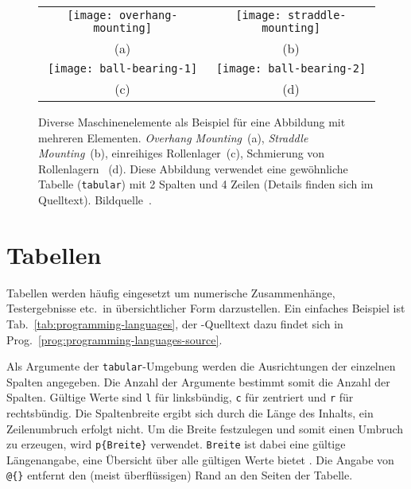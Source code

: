 \begin{figure}
	\centering\small
	\begin{tabular}{@{}c@{\hspace{12mm}}c@{}} %
		\texttt{[image: overhang-mounting]} &
		\texttt{[image: straddle-mounting]}
		\\
		(a) & (b)
		\\[4pt]    %
		\texttt{[image: ball-bearing-1]} &
		\texttt{[image: ball-bearing-2]}
		\\
		(c) & (d)
	\end{tabular}
%
	\caption{Diverse Maschinenelemente als Beispiel für eine Abbildung mit
	mehreren Elementen. \emph{Overhang Mounting}~(a), \emph{Straddle
	Mounting}~(b), einreihiges Rollenlager~(c), Schmierung von Rollenlagern~
	(d). Diese Abbildung verwendet eine gewöhnliche Tabelle
	(\texttt{tabular}) mit 2 Spalten und 4 Zeilen (Details finden sich im
	Quelltext). Bildquelle~\cite{Faires1934}.}
	\label{fig:Bearings}
\end{figure}


\section{Tabellen}
\label{sec:tabellen}

Tabellen werden häufig eingesetzt um numerische Zusammenhänge, Testergebnisse
etc.\ in übersichtlicher Form darzustellen. Ein einfaches Beispiel ist
Tab.~\ref{tab:programming-languages}, der \latex-Quelltext dazu findet sich in
Prog.~\ref{prog:programming-languages-source}.

Als Argumente der \texttt{tabular}-Umgebung werden die Ausrichtungen der
einzelnen Spalten angegeben. Die Anzahl der Argumente bestimmt somit die
Anzahl der Spalten. Gültige Werte sind \texttt{l} für linksbündig, \texttt{c}
für zentriert und \texttt{r} für rechtsbündig. Die Spaltenbreite ergibt sich
durch die Länge des Inhalts, ein Zeilenumbruch erfolgt nicht. Um die Breite
festzulegen und somit einen Umbruch zu erzeugen, wird \verb|p{Breite}|
verwendet. \texttt{Breite} ist dabei eine gültige Längenangabe, eine
Übersicht über alle gültigen Werte bietet \cite{WikibooksLaTeXLengths2018}.
Die Angabe von \verb|@{}| entfernt den (meist überflüssigen) Rand an den
Seiten der Tabelle.

